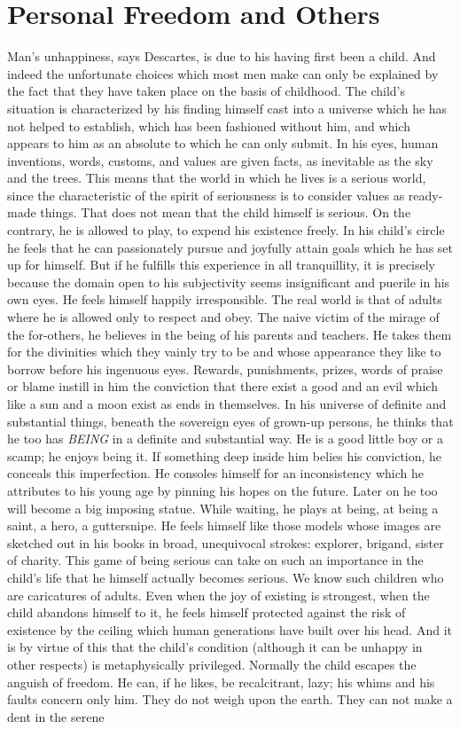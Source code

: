 \documentclass[11pt]{article}
\begin{document}
\section{Personal Freedom and Others}
Man’s unhappiness, says Descartes, is due to his having first been a child. And indeed the unfortunate choices which most men make can only be explained by the fact that they have taken place on the basis of childhood. The child’s situation is characterized by his finding himself cast into a universe which he has not helped to establish, which has been fashioned without him, and which appears to him as an absolute to which he can only submit. In his eyes, human inventions, words, customs, and values are given facts, as inevitable as the sky and the trees. This means that the world in which he lives is a serious world, since the characteristic of the spirit of seriousness is to consider values as ready-made things. That does not mean that the child himself is serious. On the contrary, he is allowed to play, to expend his existence freely. In his child’s circle he feels that he can passionately pursue and joyfully attain goals which he has set up for himself. But if he fulfills this experience in all tranquillity, it is precisely because the domain open to his subjectivity seems insignificant and puerile in his own eyes. He feels himself happily irresponsible. The real world is that of adults where he is allowed only to respect and obey. The naive victim of the mirage of the for-others, he believes in the being of his parents and teachers. He takes them for the divinities which they vainly try to be and whose appearance they like to borrow before his ingenuous eyes. Rewards, punishments, prizes, words of praise or blame instill in him the conviction that there exist a good and an evil which like a sun and a moon exist as ends in themselves. In his universe of definite and substantial things, beneath the sovereign eyes of grown-up persons, he thinks that he too has \textit{BEING} in a definite and substantial way. He is a good little boy or a scamp; he enjoys being it. If something deep inside him belies his conviction, he conceals this imperfection. He consoles himself for an inconsistency which he attributes to his young age by pinning his hopes on the future. Later on he too will become a big imposing statue. While waiting, he plays at being, at being a saint, a hero, a guttersnipe. He feels himself like those models whose images are sketched out in his books in broad, unequivocal strokes: explorer, brigand, sister of charity. This game of being serious can take on such an importance in the child’s life that he himself actually becomes serious. We know such children who are caricatures of adults. Even when the joy of existing is strongest, when the child abandons himself to it, he feels himself protected against the risk of existence by the ceiling which human generations have built over his head. And it is by virtue of this that the child’s condition (although it can be unhappy in other respects) is metaphysically privileged. Normally the child escapes the anguish of freedom. He can, if he likes, be recalcitrant, lazy; his whims and his faults concern only him. They do not weigh upon the earth. They can not make a dent in the serene 
\end{document}

